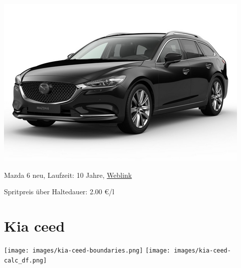 \documentclass[landscape, DIV=99, 14pt]{scrartcl}
\begin{document}
\pagebreak
\null
\vspace{2cm}
\begin{center}
\includegraphics[width=0.9\columnwidth]{cars/mazda-6-neu.png}

Mazda 6 neu, Laufzeit: 10 Jahre, \href{https://konfigurator.meinauto.de/mazda/neuwagen/48-6/angebote/6-kombi/konfigurator/\#!/extras/exclusive-line/8846370/10,11/private/65352-5416-204698/984/61c9aa657e74c/cash-purchase/32545--287374/48,0,10000,0,0,0,0,0,}{Weblink}

Spritpreis \"uber Haltedauer: 2.00 \euro{}/l

\end{center}

\pagebreak


\twocolumn

\section*{Kia ceed}
\begin{center}
\texttt{[image: images/kia-ceed-boundaries.png]}
\null
\vspace{0.5cm}
\texttt{[image: images/kia-ceed-calc\_df.png]}
\end{center}
\end{document}
